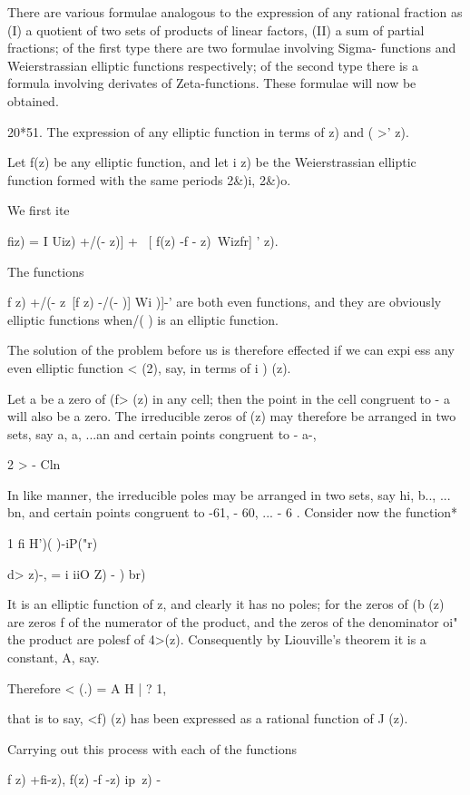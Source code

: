 {There are various formulae analogous to the expression of any rational
fraction as (I) a quotient of two sets of products of linear factors,
(II) a sum of partial fractions; of the first type there are two
formulae involving Sigma- functions and Weierstrassian elliptic
functions respectively; of the second type there is a formula
involving derivates of Zeta-functions. These formulae will now be
obtained.

20*51. The expression of any elliptic function in terms of z) and ( >'
z).

Let f(z) be any elliptic function, and let i z) be the Weierstrassian
elliptic function formed with the same periods 2\&)i, 2\&)o.

We first ite

fiz) = I Uiz) +/(- z)] + \ [ f(z) -f - z)\ Wizfr] ' z).

%
%

The functions

f z) +/(- z\ [f z) -/(- )] Wi )]-' are both even functions, and they
are obviously elliptic functions when/( ) is an elliptic function.

The solution of the problem before us is therefore effected if we can
expi ess any even elliptic function < (2), say, in terms of i ) (z).

Let a be a zero of (f> (z) in any cell; then the point in the cell
congruent to - a will also be a zero. The irreducible zeros of (z) may
therefore be arranged in two sets, say a, a, ...an and certain
points congruent to - a-,

 2 >    - Cln 

In like manner, the irreducible poles may be arranged in two sets, say
hi, b.., ... bn, and certain points congruent to -61, - 60, ... - 6 .
Consider now the function*

1 fi H')( )-iP("r)

d> z)-, = i iiO Z) - ) br)

It is an elliptic function of z, and clearly it has no poles; for the
zeros of (b (z) are zeros f of the numerator of the product, and the
zeros of the denominator oi" the product are polesf of 4>(z).
Consequently by Liouville's theorem it is a constant, A, say.

Therefore < (.) = A H | ? 1,

that is to say, <f) (z) has been expressed as a rational function of J
(z).

Carrying out this process with each of the functions

f z) +fi-z), f(z) -f -z) ip\ z) -\

}
